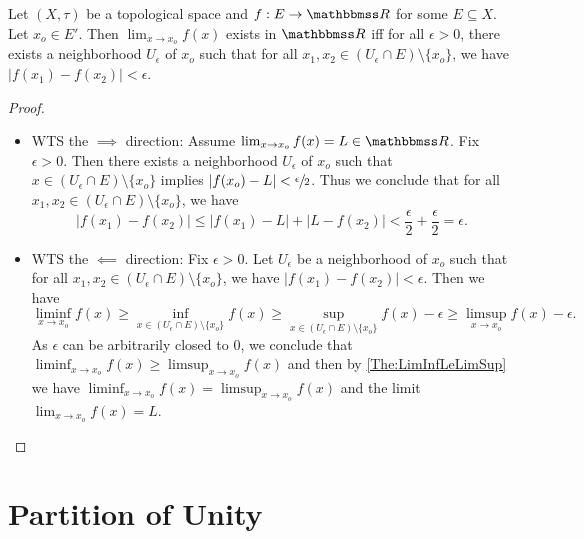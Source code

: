 \documentclass[screen,single]{techreport}
\numberwithin{equation}{section}
\begin{document}
\begin{theorem}\label{The:CauchyLemma}
  Let $(X,\tau)$ be a topological space and $f : E \to \bbR$ for some $E \subseteq X$.
  Let $x_o \in E'$.
  Then $\lim_{x \to x_o} f(x)$ exists in $\bbR$ iff for all $\epsilon > 0$, there exists a neighborhood $U_\epsilon$ of $x_o$ such that for all $x_1,x_2 \in (U_\epsilon \cap E) \setminus \{ x_o \}$, we have $|f(x_1)-f(x_2)| < \epsilon$.
\end{theorem}
\begin{proof}\
  \begin{itemize}
    \item WTS the $\implies$ direction: Assume $\lim_{x \to x_o} f(x) = L \in \bbR$.
    Fix $\epsilon > 0$.
    Then there exists a neighborhood $U_\epsilon$ of $x_o$ such that $x \in (U_\epsilon \cap E) \setminus \{x_o\}$ implies $|f(x_o)-L| < \sfrac{\epsilon}{2}$.
    Thus we conclude that for all $x_1,x_2 \in (U_\epsilon \cap E) \setminus \{x_o\}$, we have
    \[
    |f(x_1)-f(x_2)| \le |f(x_1)-L|+|L-f(x_2)| < \frac{\epsilon}{2}+\frac{\epsilon}{2} = \epsilon.
    \]
    
    \item WTS the $\impliedby$ direction: Fix $\epsilon > 0$. Let $U_\epsilon$ be a neighborhood of $x_o$ such that for all $x_1,x_2 \in (U_\epsilon \cap E) \setminus \{x_o\}$, we have $|f(x_1)-f(x_2)| < \epsilon$.
    Then we have
    \[
    \liminf_{x \to x_o} f(x) \ge \inf_{x \in (U_\epsilon \cap E) \setminus \{x_o\}}f(x) \ge \sup_{x \in (U_\epsilon \cap E) \setminus \{x_o\}} f(x) - \epsilon \ge \limsup_{x \to x_o} f(x) - \epsilon.
    \]
    As $\epsilon$ can be arbitrarily closed to $0$, we conclude that $\liminf_{x \to x_o} f(x) \ge \limsup_{x \to x_o} f(x)$ and then by \cref{The:LimInfLeLimSup} we have $\liminf_{x \to x_o} f(x) = \limsup_{x \to x_o} f(x)$ and the limit $\lim_{x \to x_o} f(x) = L$.
  \end{itemize}
\end{proof}

\section{Partition of Unity}
\end{document}
